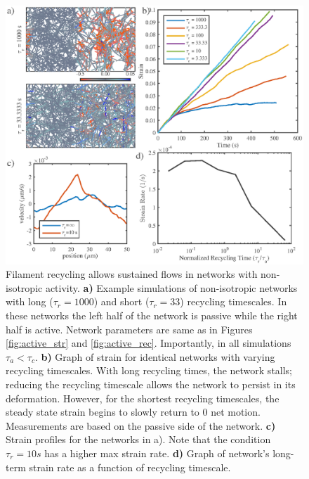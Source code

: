 \documentclass[10pt,letterpaper]{article}
\begin{document}
\begin{figure}[h!]
	\centering
	\includegraphics[width=\hsize]{figures/figure8}
	\caption{\label{fig:flow_ex}  Filament recycling allows sustained flows in networks with non-isotropic activity. \textbf{a)} Example simulations of non-isotropic networks with long ($\tau_r=1000$) and short ($\tau_r=33$) recycling timescales. In these networks the left half of the network is passive while the right half is active.  Network parameters are same as in Figures \ref{fig:active_str} and \ref{fig:active_rec}. Importantly, in all simulations $\tau_a<\tau_c$. \textbf{b)} Graph of strain for identical networks with varying recycling timescales.  With long recycling times, the network stalls; reducing the recycling timescale allows the network to persist in its deformation.  However, for the shortest recycling timescales, the steady state strain begins to slowly return to 0 net motion.  Measurements are based on the passive side of the network. \textbf{c)} Strain profiles for the networks in a).  Note that the condition $\tau_r=10s$ has a higher max strain rate.   \textbf{d)} Graph of network's long-term strain rate as a function of recycling timescale. }
\end{figure}
\end{document}
